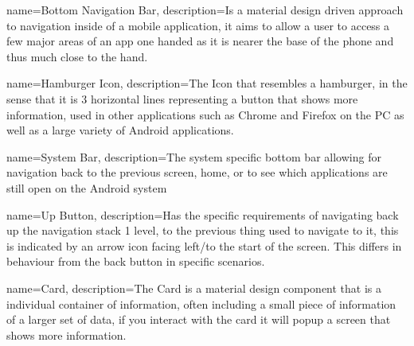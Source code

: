  {
    name=Bottom Navigation Bar,
    description={Is a material design driven approach to navigation inside of a mobile application, it aims to allow a user to access a few major areas of an app one handed as it is nearer the base of the phone and thus much close to the hand.}
}

 {
    name=Hamburger Icon,
    description={The Icon that resembles a hamburger, in the sense that it is 3 horizontal lines representing a button that shows more information, used in other applications such as Chrome and Firefox on the PC as well as a large variety of Android applications.}
}

 {
    name=System Bar,
    description={The system specific bottom bar allowing for navigation back to the previous screen, home, or to see which applications are still open on the Android system}
}

 {
    name=Up Button,
    description={Has the specific requirements of navigating back up the navigation stack 1 level, to the previous thing used to navigate to it, this is indicated by an arrow icon facing left/to the start of the screen. This differs in behaviour from the back button in specific scenarios.}
}

 {
    name=Card,
    description={The Card is a material design component that is a individual container of information, often including a small piece of information of a larger set of data, if you interact with the card it will popup a screen that shows more information.}
}